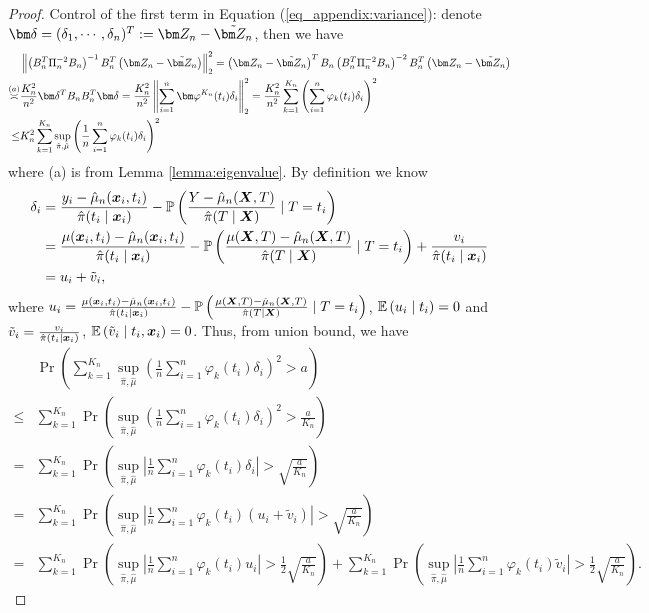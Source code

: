 \begin{proof}
Control of the first term in Equation (\ref{eq_appendix:variance}): denote $\bm\delta=(\delta_1,\cdots,\delta_n)^T:=\Zn-\tilde\Zn$,  then we have
\begin{equation}\label{eq_appendix:variance_eq1}
\begin{split}
&\left\|\left(B_n^T\Pi_n^{-2}B_n\right)^{-1}B_n^T\left(\Zn-\tilde\Zn\right)\right\|^2_2
=\left(\Zn-\tilde\Zn\right)^TB_n\left(B_n^T\Pi_n^{-2}B_n\right)^{-2}B_n^T\left(\Zn-\tilde\Zn\right)
\\\overset{(a)}{\asymp}&\frac{K_n^2}{n^2}\bm\delta^T B_n B_n^T\bm\delta
=\frac{K_n^2}{n^2}\left\|\sum_{i=1}^n\vpk(t_i)\delta_i\right\|_2^2
=\frac{K_n^2}{n^2}\sum_{k=1}^{K_n}\left(\sum_{i=1}^n\varphi_k(t_i)\delta_i\right)^2
\\\leq &K_n^2\sum_{k=1}^{K_n}\sup_{\hat{\pi},\hat\mu}\left(\frac{1}{n}\sum_{i=1}^n\varphi_k(t_i)\delta_i\right)^2
\end{split}
\end{equation}
where (a) is from Lemma \ref{lemma:eigenvalue}. By definition we know
\begin{equation*}
\begin{split}
\delta_i
&=\frac{y_i-\hat \mu_n(\boldsymbol{x}_i,t_i)}{\hat\pi(t_i\mid\boldsymbol{x}_i)}-\mathbb{P}\left(\frac{Y-\hat \mu_n(\boldsymbol{X},T)}{\hat\pi(T\mid\boldsymbol{X})}\mid T=t_i\right)
\\&=\frac{\mu(\boldsymbol{x}_i,t_i)-\hat \mu_n(\boldsymbol{x}_i,t_i)}{\hat\pi(t_i\mid\boldsymbol{x}_i)}-\mathbb{P}\left(\frac{\mu(\boldsymbol{X},T)-\hat \mu_n(\boldsymbol{X},T)}{\hat\pi(T\mid\boldsymbol{X})}\mid T=t_i\right)+\frac{v_i}{\hat\pi(t_i\mid\boldsymbol{x}_i)}
\\&=u_i+\tilde v_i,
\end{split}
\end{equation*}
where $u_i=\frac{\mu(\boldsymbol{x}_i,t_i)-\hat \mu_n(\boldsymbol{x}_i,t_i)}{\hat\pi(t_i\mid\boldsymbol{x}_i)}-\mathbb{P}\left(\frac{\mu(\boldsymbol{X},T)-\hat \mu_n(\boldsymbol{X},T)}{\hat\pi(T\mid\boldsymbol{X})}\mid T=t_i\right)$, $\mathbb{E} \left(u_i\mid t_i\right)=0$ and $\tilde v_i=\frac{v_i}{\hat\pi(t_i\mid\boldsymbol{x}_i)}$, $\mathbb{E}\left(\tilde v_i\mid t_i,\boldsymbol{x}_i\right)=0$.
Thus, from union bound, we have
\begin{align}
&\Pr\left(\sum_{k=1}^{K_n}\sup_{\hat{\pi},\hat\mu}\left(\frac{1}{n}\sum_{i=1}^n\varphi_k(t_i)\delta_i\right)^2>a\right) \nonumber
\\\leq&
\sum_{k=1}^{K_n} \Pr\left(\sup_{\hat{\pi},\hat\mu}\left(\frac{1}{n}\sum_{i=1}^n\varphi_k(t_i)\delta_i\right)^2>\frac{a}{K_n}\right) \nonumber
\\=&
\sum_{k=1}^{K_n} \Pr\left(\sup_{\hat{\pi},\hat\mu}\left|\frac{1}{n}\sum_{i=1}^n\varphi_k(t_i)\delta_i\right|>\sqrt{\frac{a}{K_n}}\right) \nonumber
\\=&\sum_{k=1}^{K_n} \Pr\left(\sup_{\hat{\pi},\hat\mu}\left|\frac{1}{n}\sum_{i=1}^n\varphi_k(t_i)(u_i+\tilde v_i)\right|>\sqrt{\frac{a}{K_n}}\right)\nonumber
\\=&\sum_{k=1}^{K_n} \Pr\left(\sup_{\hat{\pi},\hat\mu}\left|\frac{1}{n}\sum_{i=1}^n\varphi_k(t_i) u_i\right|>\frac{1}{2}\sqrt{\frac{a}{K_n}}\right)
+
\sum_{k=1}^{K_n} \Pr\left(\sup_{\hat{\pi},\hat\mu}\left|\frac{1}{n}\sum_{i=1}^n\varphi_k(t_i)\tilde v_i\right|>\frac{1}{2}\sqrt{\frac{a}{K_n}}\right).
\label{eq_appendix:Kn_delta}
\end{align}


\end{proof}

